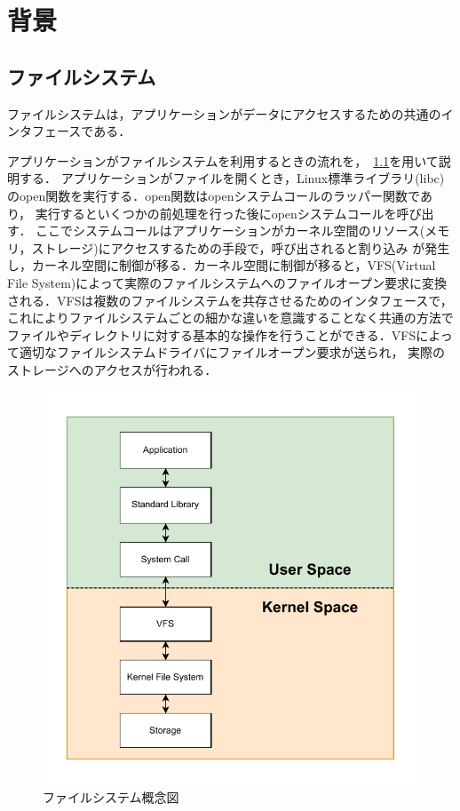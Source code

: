 \documentclass[a4paper，11pt]{jreport}
\begin{document}
\chapter{背景}

\section{ファイルシステム}
ファイルシステムは，アプリケーションがデータにアクセスするための共通のインタフェースである．

アプリケーションがファイルシステムを利用するときの流れを，\figurename~\ref{fig:Filesystem}を用いて説明する．
アプリケーションがファイルを開くとき，Linux標準ライブラリ(libc)のopen関数を実行する．open関数はopenシステムコールのラッパー関数であり，
実行するといくつかの前処理を行った後にopenシステムコールを呼び出す．
ここでシステムコールはアプリケーションがカーネル空間のリソース(メモリ，ストレージ)にアクセスするための手段で，呼び出されると割り込み
が発生し，カーネル空間に制御が移る．カーネル空間に制御が移ると，VFS(Virtual File System)によって実際のファイルシステムへのファイルオープン要求に変換される．VFSは複数のファイルシステムを共存させるためのインタフェースで，これによりファイルシステムごとの細かな違いを意識することなく共通の方法で
ファイルやディレクトリに対する基本的な操作を行うことができる．VFSによって適切なファイルシステムドライバにファイルオープン要求が送られ，
実際のストレージへのアクセスが行われる．

\begin{figure}[h]
	\begin{minipage}[b]{1\columnwidth}
		\centering
		\includegraphics[width=0.9\linewidth]{./figure/filesystem.pdf}
		\caption{ファイルシステム概念図}
		\label{fig:Filesystem}
	\end{minipage}
\end{figure}
\end{document}
